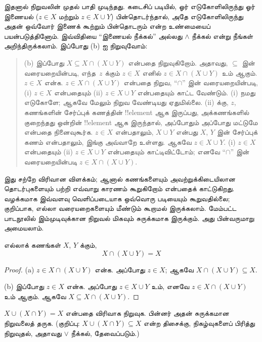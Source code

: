 \documentclass[../../../include/open-logic-section]{subfiles}
\begin{document}
\begin{explain}
இதனால் நிறுவலின் முதல் பாதி முடிந்தது. கடைசிப் படியில்,
ஓர் எடுகோளிலிருந்து ஓர் இணையல் ($z \in X$ மற்றும்
$z \in X \cup Y$) பின்தொடர்ந்தால், அதே எடுகோளிலிருந்து
அதன் ஒவ்வோர் இணைக் கூற்றும் பின்தொடரும் என்ற உண்மையைப்
பயன்படுத்தினோம். இவ்விதியை ``இணையல் நீக்கல்'' அல்லது
$\land$ நீக்கல் என்று நீங்கள் அறிந்திருக்கலாம்.
இப்போது (b) ஐ நிறுவுவோம்:

\begin{quote}
(b) இப்போது $X \subseteq X \cap (X \cup Y)$ என்பதை
நிறுவுகிறோம். அதாவது, $\subseteq$ இன் வரையறையின்படி,
எந்த~$z$ க்கும் $z \in X$ எனில்
$z \in X \cap (X \cup Y)$ உம் ஆகும்.
$z \in X$ என்க. $z \in X \cap (X \cup Y)$ என்பதை
நிறுவ, ``$\cap$'' இன் வரையறையின்படி, (i) $z \in X$
என்பதையும் (ii) $z \in X \cup Y$ என்பதையும் காட்ட வேண்டும்.
(i) நமது எடுகோளே; ஆகவே மேலும் நிறுவ வேண்டியது ஏதுமில்லை.
(ii) க்கு, $z$, கணங்களின் சேர்ப்புக் கணத்தின் !!{element}
ஆக இருப்பது, அக்கணங்களில் குறைந்தது ஒன்றின் !!{element}
ஆக இருந்தால், அப்போதும் அப்போது மட்டுமே என்பதை நினைவுகூர்க.
$z \in X$ என்பதாலும், $X \cup Y$ என்பது $X$, $Y$ இன்
சேர்ப்புக் கணம் என்பதாலும், இங்கு அவ்வாறே உள்ளது.
ஆகவே $z \in X \cup Y$. (i) $z \in X$ என்பதையும்
(ii) $z \in X \cup Y$ என்பதையும் காட்டிவிட்டோம்;
எனவே ``$\cap$'' இன் வரையறையின்படி
$z \in X \cap (X \cup Y)$.
\end{quote}

இது சற்றே விரிவான விளக்கம்; ஆனால் கணங்களையும்
அவற்றுக்கிடையிலான தொடர்புகளையும் பற்றி எவ்வாறு காரணம்
கூறுகிறோம் என்பதைக் காட்டுகிறது. வழக்கமாக இவ்வளவு
வெளிப்படையாக ஒவ்வொரு படியையும் கூறுவதில்லை; குறிப்பாக,
எல்லா வரையறைகளையும் மீண்டும் கூறாமல் இருக்கலாம்.
மேம்பட்ட பாடநூலில் இம்முடிவுக்கான நிறுவல் மிகவும்
சுருக்கமாக இருக்கும். அது பின்வருமாறு அமையலாம்.
\end{explain}

\begin{prop}[உட்கவர் பண்பு]
எல்லாக் கணங்கள் $X$, $Y$ க்கும்,
\[
X \cap (X \cup Y) = X
\]
\end{prop}

\begin{proof}
(a) $z \in X \cap (X \cup Y)$ என்க. அப்போது $z \in X$;
ஆகவே $X \cap (X \cup Y) \subseteq X$.

(b) இப்போது $z \in X$ என்க. அப்போது $z \in X \cup Y$
உம், எனவே $z \in X \cap (X \cup Y)$ உம் ஆகும்.
ஆகவே $X \subseteq X \cap (X \cup Y)$.
\end{proof}

\begin{prob}
$X \cup (X \cap Y) = X$ என்பதை விரிவாக நிறுவுக.
பின்னர் அதன் சுருக்கமான நிறுவலைத் தருக.
(குறிப்பு: $X \cup (X \cap Y) \subseteq X$ என்ற திசைக்கு,
நிகழ்வுகளைப் பிரித்து நிறுவுதல், அதாவது $\lor$ நீக்கல்,
தேவைப்படும்.)
\end{prob}
\end{document}
